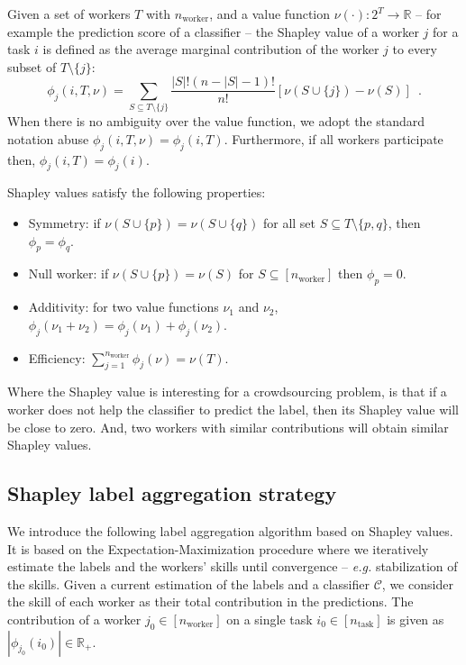 \documentclass{cap2024}
\begin{document}
\begin{definition}
Given a set of workers $T$ with $n_\text{worker}$, and a value function $\nu(\cdot): 2^T\rightarrow \mathbb{R}$ -- for example the prediction score of a classifier -- the Shapley value of a worker $j$ for a task $i$ is defined as the average marginal contribution of the worker $j$ to every subset of $T\setminus\{j\}$:
\begin{equation}
  \phi_j(i, T, \nu) = \sum_{S\subseteq T\setminus\{j\}} \frac{|S|!(n-|S|-1)!}{n!} \left[\nu(S\cup\{j\}) - \nu(S)\right]\enspace.
\end{equation}
When there is no ambiguity over the value function, we adopt the standard notation abuse $\phi_j(i, T, \nu)=\phi_j(i, T)$. Furthermore, if all workers participate then, $\phi_j(i, T)=\phi_j(i)$.
\end{definition}
Shapley values satisfy the following properties:
\begin{itemize}
  \item Symmetry: if $\nu(S\cup\{p\})=\nu(S\cup\{q\})$ for all set $S\subseteq T\setminus\{p,q\}$, then $\phi_p=\phi_q$.
  \item Null worker: if $\nu(S\cup\{p\})=\nu(S)$ for $S\subseteq [n_\text{worker}]$ then $\phi_p=0$.
  \item Additivity: for two value functions $\nu_1$ and $\nu_2$, $\phi_j(\nu_1+\nu_2)=\phi_j(\nu_1)+\phi_j(\nu_2)$.
  \item Efficiency: $\sum_{j=1}^{n_\text{worker}} \phi_j(\nu)=\nu(T)$.
\end{itemize}

Where the Shapley value is interesting for a crowdsourcing problem, is that if a worker does not help the classifier to predict the label, then its Shapley value will be close to zero. And, two workers with similar contributions will obtain similar Shapley values.

\subsection{Shapley label aggregation strategy}

We introduce the following label aggregation algorithm based on Shapley values.
It is based on the Expectation-Maximization procedure where we iteratively estimate the labels and the workers' skills until convergence -- \emph{e.g.} stabilization of the skills.
Given a current estimation of the labels and a classifier $\mathcal{C}$, we consider the skill of each worker as their total contribution in the predictions.
The contribution of a worker $j_0\in[n_\text{worker}]$ on a single task $i_0\in [n_\text{task}]$ is given as $|\phi_{j_0}(i_0)|\in\mathbb{R}_+$.
\end{document}
